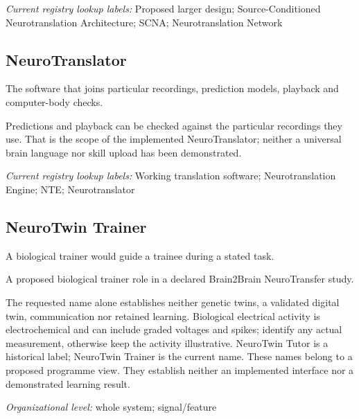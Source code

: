 \noindent\textit{Current registry lookup labels:} Proposed larger design; Source-Conditioned Neurotranslation Architecture; SCNA; Neurotranslation Network\par

\begin{samepage}
\subsection*{NeuroTranslator}
\noindent The software that joins particular recordings, prediction models, playback and computer-body checks.\par
\end{samepage}
\begin{samepage}
\noindent Predictions and playback can be checked against the particular recordings they use. That is the scope of the implemented NeuroTranslator; neither a universal brain language nor skill upload has been demonstrated.\par\nopagebreak[4]

\end{samepage}


\noindent\textit{Current registry lookup labels:} Working translation software; Neurotranslation Engine; NTE; Neurotranslator\par

\subsection*{NeuroTwin Trainer}
\noindent A biological trainer would guide a trainee during a stated task.\par
\noindent A proposed biological trainer role in a declared Brain2Brain NeuroTransfer study.\par
\noindent The requested name alone establishes neither genetic twins, a validated digital twin, communication nor retained learning. Biological electrical activity is electrochemical and can include graded voltages and spikes; identify any actual measurement, otherwise keep the activity illustrative. NeuroTwin Tutor is a historical label; NeuroTwin Trainer is the current name. These names belong to a proposed programme view. They establish neither an implemented interface nor a demonstrated learning result.\par
\noindent\textit{Organizational level:} whole system; signal/feature\par

